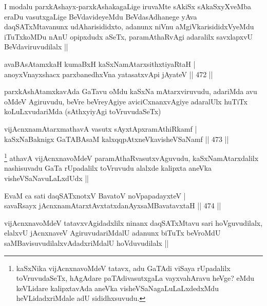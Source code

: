 \begin{artha}
I modalu parxkAshayx-parxkAshakagaLige iruvaMte sAkiSx sAkaSxyXveMba eraDu vasutxgaLige BeVdavideyeMdu BeVdasAdhanege yAva daqSATxMtavanunx udAharisididxto, adanunx niVnu aMgiVkarisididxVyeMdu iTuTxkoMDu nAnU opipxdudx aSeTx, paramAthaRvAgi adaralilx savxlapxvU BeVdaviruvudilalx ||
\end{artha}


\begin{shl}
avaBAsAtamxkaH kumaBxH kaSxNamAtarxsithxtiyaRtaH | \\
anoyxV\s nayxshacx parxbanedhxVna yatasatxvApi jAyateV \hfill||  472 ||  
\end{shl}

\begin{artha}
parxkAshAtamxkavAda GaTavu oMdu kaSxNa mAtarxviruvudu, adariMda avu oMdeV Agiruvudu, beVre beVreyAgiye aviciCxnanxvAgiye adaralUlx huTiTx koLuLxvudariMda (sAthxyiyAgi toVruvudaSeTx) 
\end{artha}


\begin{shl}
vijAcnxnamAtarxmathavA vasutx sAyxtApxramAthiRkamf | \\
kaSxNaBaknigx GaTABAsaM kalxqqpAtxneVkavisheVSaNamf \hfill||  473 ||  
\end{shl}

\begin{artha}
\footnote{kaSxNika vijAcnxnavoMdeV tatavx, adu GaTAdi viSaya rUpadalilx toVruvudaSeTx, hAgAdare paTAdivasutxgaLa vayxvahAravu heVge? eMdu keVLidare kalipxtavAda aneVka visheVSaNagaLuLaLxdedxMdu heVLidadxriMdale adU sididhxsuvudu.} athavA vijAcnxnavoMdeV paramAthaRvasutxvAguvudu, kaSxNamAtarxdalilx nashisuvadu GaTa rUpadalilx toVruvudu alalxde kalipxta aneVka visheVSaNavuLaLxdUdx ||
\end{artha}

\begin{shl}
EvaM ca sati daqSATxnotxV BavatoV noVpapadayxteV | \\
savaRsayx jAcnxnamAtarxtAvxtatxdanAyxsaMBavatavxtaH \hfill||  474 ||  
\end{shl}

\begin{artha}
vijAcnxnavoMdeV tatavxvAgidadxlilx ninanx daqSATxMtavu sari hoVguvudilalx, elalxvU jAcnxnaveV AgiruvudariMdalU adanunx biTuTx beVroMdU saMBavisuvudilalxvAdadxriMdalU hoVduvudilalx ||
\end{artha}

